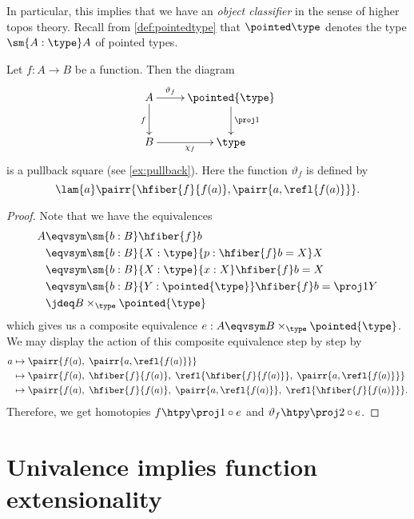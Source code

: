 \noindent
{}%
%
%
In particular, this implies that we have an \emph{object classifier} in the sense of higher topos theory.
Recall from \cref{def:pointedtype} that $\pointed\type$ denotes the type $\sm{A:\type} A$ of pointed types.

\begin{thm}\label{thm:object-classifier}
Let $f:A\to B$ be a function. Then the diagram
\begin{equation*}
  \vcenter{\xymatrix{
      A\ar[r]^-{\vartheta_f} \ar[d]_{f} &
      \pointed{\type}\ar[d]^{\proj1}\\
      B\ar[r]_{\chi_f} &
      \type
      }}
\end{equation*}
is a pullback square (see \cref{ex:pullback}).
Here the function $\vartheta_f$ is defined by
\begin{equation*}
 \lam{a} \pairr{\hfiber{f}{f(a)},\pairr{a,\refl{f(a)}}}.
\end{equation*}
\end{thm}
\begin{proof}
Note that we have the equivalences
\begin{align*}
A & \eqvsym \sm{b:B} \hfiber{f}b\\
& \eqvsym \sm{b:B}{X:\type}{p:\hfiber{f}b= X} X\\
& \eqvsym \sm{b:B}{X:\type}{x:X} \hfiber{f}b= X\\
& \eqvsym \sm{b:B}{Y:\pointed{\type}} \hfiber{f}b = \proj1 Y\\
& \jdeq B\times_{\type}\pointed{\type}
\end{align*}
which gives us a composite equivalence $e:A\eqvsym B\times_\type\pointed{\type}$.
We may display the action of this composite equivalence step by step by
\begin{align*}
a & \mapsto \pairr{f(a),\; \pairr{a,\refl{f(a)}}}\\
& \mapsto \pairr{f(a), \; \hfiber{f}{f(a)}, \; \refl{\hfiber{f}{f(a)}}, \; \pairr{a,\refl{f(a)}}}\\
& \mapsto \pairr{f(a), \; \hfiber{f}{f(a)}, \; \pairr{a,\refl{f(a)}}, \; \refl{\hfiber{f}{f(a)}}}.
\end{align*}
Therefore, we get homotopies $f\htpy\proj1\circ e$ and $\vartheta_f\htpy \proj2\circ e$.
\end{proof}



\section{Univalence implies function extensionality}
\label{sec:univalence-implies-funext}

